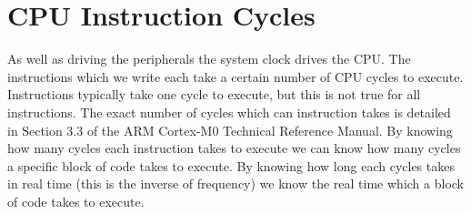\section{CPU Instruction Cycles}
As well as driving the peripherals the system clock drives the CPU. The instructions which we write each take a certain number of CPU cycles to execute. Instructions typically take one cycle to execute, but this is not true for all instructions. The exact number of cycles which can instruction takes is detailed in Section 3.3 of the ARM Cortex-M0 Technical Reference Manual. By knowing how many cycles each instruction takes to execute we can know how many cycles a specific block of code takes to execute. By knowing how long each cycles takes in real time (this is the inverse of frequency) we know the real time which a block of code takes to execute. 
